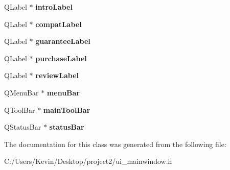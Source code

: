 \begin{DoxyCompactItemize}
\item 
\mbox{\label{class_ui___main_window_afffd4168367a5d174f6d6b19d317ee4f}} 
Q\+Label $\ast$ {\bfseries intro\+Label}
\item 
\mbox{\label{class_ui___main_window_a358d6402556ca5be259dd03cbd4e5383}} 
Q\+Label $\ast$ {\bfseries compat\+Label}
\item 
\mbox{\label{class_ui___main_window_ad9d2d064e83fe3e6d0a778c3c33ccd9b}} 
Q\+Label $\ast$ {\bfseries guarantee\+Label}
\item 
\mbox{\label{class_ui___main_window_a3de9eb25bf7f88be15ef58dcefeb2bf4}} 
Q\+Label $\ast$ {\bfseries purchase\+Label}
\item 
\mbox{\label{class_ui___main_window_ab5ee368f7a2ec0cfdbdfb8b4fabb31c2}} 
Q\+Label $\ast$ {\bfseries review\+Label}
\item 
\mbox{\label{class_ui___main_window_a2be1c24ec9adfca18e1dcc951931457f}} 
Q\+Menu\+Bar $\ast$ {\bfseries menu\+Bar}
\item 
\mbox{\label{class_ui___main_window_a5172877001c8c7b4e0f6de50421867d1}} 
Q\+Tool\+Bar $\ast$ {\bfseries main\+Tool\+Bar}
\item 
\mbox{\label{class_ui___main_window_a50fa481337604bcc8bf68de18ab16ecd}} 
Q\+Status\+Bar $\ast$ {\bfseries status\+Bar}
\end{DoxyCompactItemize}


The documentation for this class was generated from the following file\+:\begin{DoxyCompactItemize}
\item 
C\+:/\+Users/\+Kevin/\+Desktop/project2/ui\+\_\+mainwindow.\+h\end{DoxyCompactItemize}
